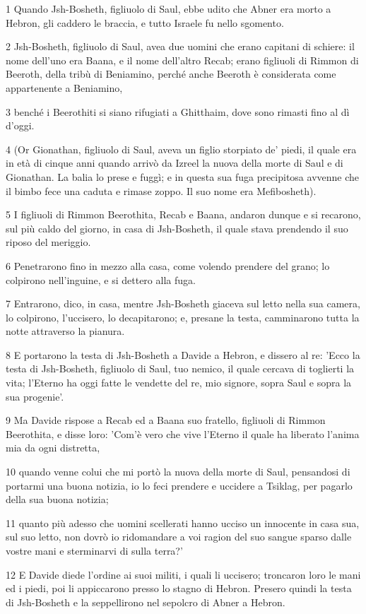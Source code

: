 \par 1 Quando Jsh-Bosheth, figliuolo di Saul, ebbe udito che Abner era morto a Hebron, gli caddero le braccia, e tutto Israele fu nello sgomento.
\par 2 Jsh-Bosheth, figliuolo di Saul, avea due uomini che erano capitani di schiere: il nome dell'uno era Baana, e il nome dell'altro Recab; erano figliuoli di Rimmon di Beeroth, della tribù di Beniamino, perché anche Beeroth è considerata come appartenente a Beniamino,
\par 3 benché i Beerothiti si siano rifugiati a Ghitthaim, dove sono rimasti fino al dì d'oggi.
\par 4 (Or Gionathan, figliuolo di Saul, aveva un figlio storpiato de' piedi, il quale era in età di cinque anni quando arrivò da Izreel la nuova della morte di Saul e di Gionathan. La balia lo prese e fuggì; e in questa sua fuga precipitosa avvenne che il bimbo fece una caduta e rimase zoppo. Il suo nome era Mefibosheth).
\par 5 I figliuoli di Rimmon Beerothita, Recab e Baana, andaron dunque e si recarono, sul più caldo del giorno, in casa di Jsh-Bosheth, il quale stava prendendo il suo riposo del meriggio.
\par 6 Penetrarono fino in mezzo alla casa, come volendo prendere del grano; lo colpirono nell'inguine, e si dettero alla fuga.
\par 7 Entrarono, dico, in casa, mentre Jsh-Bosheth giaceva sul letto nella sua camera, lo colpirono, l'uccisero, lo decapitarono; e, presane la testa, camminarono tutta la notte attraverso la pianura.
\par 8 E portarono la testa di Jsh-Bosheth a Davide a Hebron, e dissero al re: 'Ecco la testa di Jsh-Bosheth, figliuolo di Saul, tuo nemico, il quale cercava di toglierti la vita; l'Eterno ha oggi fatte le vendette del re, mio signore, sopra Saul e sopra la sua progenie'.
\par 9 Ma Davide rispose a Recab ed a Baana suo fratello, figliuoli di Rimmon Beerothita, e disse loro: 'Com'è vero che vive l'Eterno il quale ha liberato l'anima mia da ogni distretta,
\par 10 quando venne colui che mi portò la nuova della morte di Saul, pensandosi di portarmi una buona notizia, io lo feci prendere e uccidere a Tsiklag, per pagarlo della sua buona notizia;
\par 11 quanto più adesso che uomini scellerati hanno ucciso un innocente in casa sua, sul suo letto, non dovrò io ridomandare a voi ragion del suo sangue sparso dalle vostre mani e sterminarvi di sulla terra?'
\par 12 E Davide diede l'ordine ai suoi militi, i quali li uccisero; troncaron loro le mani ed i piedi, poi li appiccarono presso lo stagno di Hebron. Presero quindi la testa di Jsh-Bosheth e la seppellirono nel sepolcro di Abner a Hebron.

